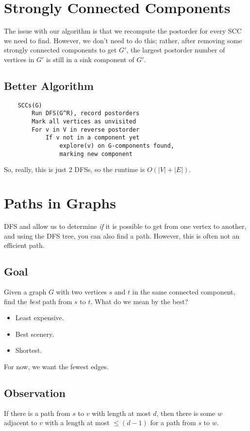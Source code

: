 \documentclass[letterpaper]{article}
\begin{document}
\section{Strongly Connected Components}
The issue with our algorithm is that we recompute the postorder for every SCC we need to find. However, we don't need to do this; rather, after removing some strongly connected components to get $G'$, the largest postorder number of vertices in $G'$ is still in a sink component of $G'$. 

\subsection{Better Algorithm}
\begin{verbatim}
    SCCs(G)
        Run DFS(G^R), record postorders
        Mark all vertices as unvisited 
        For v in V in reverse postorder 
            If v not in a component yet 
                explore(v) on G-components found,
                marking new component 
\end{verbatim}

So, really, this is just 2 DFSs, so the runtime is $O(|V| + |E|)$. 

\section{Paths in Graphs}
DFS and  allow us to determine \emph{if} it is possible to get from one vertex to another, and using the DFS tree, you can also find a path. However, this is often not an efficient path. 

\subsection{Goal}
Given a graph $G$ with two vertices $s$ and $t$ in the same connected component, find the \emph{best} path from $s$ to $t$. What do we mean by the best? 
\begin{itemize}
    \item Least expensive. 
    \item Best scenery.
    \item Shortest.
\end{itemize}
For now, we want the fewest edges. 

\subsection{Observation}
If there is a path from $s$ to $v$ with length at most $d$, then there is some $w$ adjacent to $v$ with a length at most $\leq (d - 1)$ for a path from $s$ to $w$. 
\end{document}
